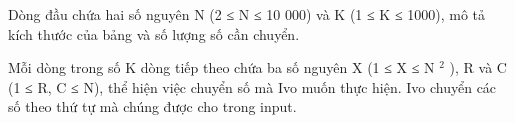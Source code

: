 Dòng đầu chứa hai số nguyên N (2 ≤ N ≤ 10 000) và K (1 ≤ K ≤ 1000), mô tả kích thước của bảng và số lượng số cần chuyển.

Mỗi dòng trong số K dòng tiếp theo chứa ba số nguyên X (1 ≤ X ≤ N $^ 2 $ ), R và C (1 ≤ R, C ≤ N), thể hiện việc chuyển số mà Ivo muốn thực hiện. Ivo chuyển các số theo thứ tự mà chúng được cho trong input.

\